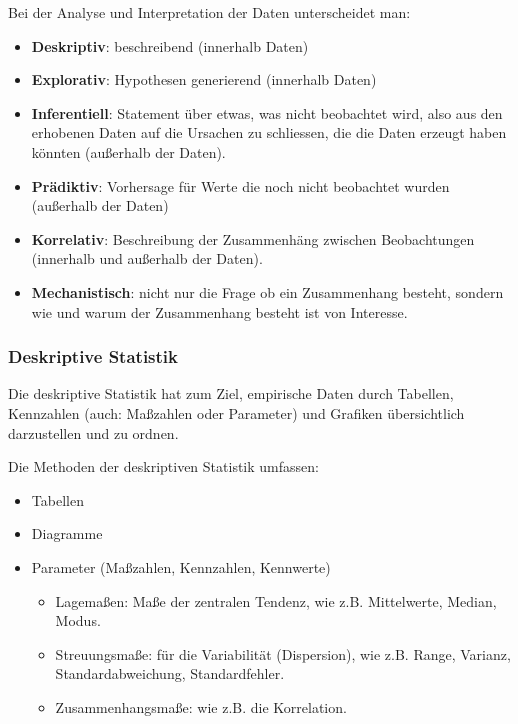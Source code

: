 \documentclass[]{article}
\providecommand{\tightlist}{%
  \setlength{\itemsep}{0pt}\setlength{\parskip}{0pt}}
\begin{document}
Bei der Analyse und Interpretation der Daten unterscheidet man:

\begin{itemize}
\tightlist
\item
  \textbf{Deskriptiv}: beschreibend (innerhalb Daten)
\item
  \textbf{Explorativ}: Hypothesen generierend (innerhalb Daten)
\item
  \textbf{Inferentiell}: Statement über etwas, was nicht beobachtet
  wird, also aus den erhobenen Daten auf die Ursachen zu schliessen, die
  die Daten erzeugt haben könnten (außerhalb der Daten).
\item
  \textbf{Prädiktiv}: Vorhersage für Werte die noch nicht beobachtet
  wurden (außerhalb der Daten)
\item
  \textbf{Korrelativ}: Beschreibung der Zusammenhäng zwischen
  Beobachtungen (innerhalb und außerhalb der Daten).
\item
  \textbf{Mechanistisch}: nicht nur die Frage ob ein Zusammenhang
  besteht, sondern wie und warum der Zusammenhang besteht ist von
  Interesse.
\end{itemize}

\subsubsection*{Deskriptive Statistik}\label{deskriptive-statistik}

Die deskriptive Statistik hat zum Ziel, empirische Daten durch Tabellen,
Kennzahlen (auch: Maßzahlen oder Parameter) und Grafiken übersichtlich
darzustellen und zu ordnen.

Die Methoden der deskriptiven Statistik umfassen:

\begin{itemize}
\tightlist
\item
  Tabellen
\item
  Diagramme
\item
  Parameter (Maßzahlen, Kennzahlen, Kennwerte)

  \begin{itemize}
  \tightlist
  \item
    Lagemaßen: Maße der zentralen Tendenz, wie z.B. Mittelwerte, Median,
    Modus.
  \item
    Streuungsmaße: für die Variabilität (Dispersion), wie z.B. Range,
    Varianz, Standardabweichung, Standardfehler.
  \item
    Zusammenhangsmaße: wie z.B. die Korrelation.
  \end{itemize}
\end{itemize}
\end{document}
